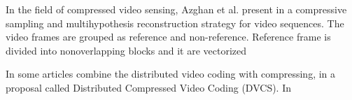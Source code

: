 In the field of compressed video sensing, Azghan et al. present in \cite{7076640} a compressive sampling and    multihypothesis reconstruction strategy for video sequences. The video frames are grouped as reference and non-reference. Reference frame is divided into nonoverlapping blocks and it are vectorized 
 
In some articles combine the distributed video coding with compressing, in a proposal called Distributed Compressed Video Coding (DVCS). In \cite{} 